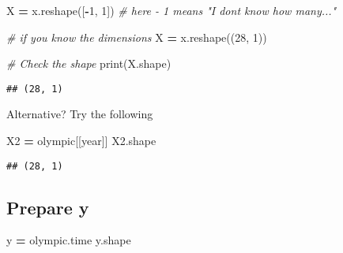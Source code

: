 \documentclass[
]{book}
\newenvironment{Shaded}{\begin{snugshade}}{\end{snugshade}}
\newcommand{\BuiltInTok}[1]{#1}
\newcommand{\CommentTok}[1]{\textcolor[rgb]{0.56,0.35,0.01}{\textit{#1}}}
\newcommand{\DecValTok}[1]{\textcolor[rgb]{0.00,0.00,0.81}{#1}}
\newcommand{\NormalTok}[1]{#1}
\newcommand{\OperatorTok}[1]{\textcolor[rgb]{0.81,0.36,0.00}{\textbf{#1}}}
\newcommand{\StringTok}[1]{\textcolor[rgb]{0.31,0.60,0.02}{#1}}
\begin{document}
\begin{Shaded}
\begin{Highlighting}[]
\NormalTok{X }\OperatorTok{=}\NormalTok{ x.reshape([}\OperatorTok{{-}}\DecValTok{1}\NormalTok{, }\DecValTok{1}\NormalTok{]) }\CommentTok{\# here {-} 1 means "I don\textquotesingle{}t know how many..."}
\end{Highlighting}
\end{Shaded}

\begin{Shaded}
\begin{Highlighting}[]
\CommentTok{\# if you know the dimensions}
\NormalTok{X }\OperatorTok{=}\NormalTok{ x.reshape((}\DecValTok{28}\NormalTok{, }\DecValTok{1}\NormalTok{))}
\end{Highlighting}
\end{Shaded}

\begin{Shaded}
\begin{Highlighting}[]
\CommentTok{\# Check the shape}
\BuiltInTok{print}\NormalTok{(X.shape)}
\end{Highlighting}
\end{Shaded}

\begin{verbatim}
## (28, 1)
\end{verbatim}

Alternative? Try the following

\begin{Shaded}
\begin{Highlighting}[]
\NormalTok{X2 }\OperatorTok{=}\NormalTok{ olympic[[}\StringTok{\textquotesingle{}year\textquotesingle{}}\NormalTok{]]}
\NormalTok{X2.shape}
\end{Highlighting}
\end{Shaded}

\begin{verbatim}
## (28, 1)
\end{verbatim}

\hypertarget{prepare-y}{%
\subsection{Prepare y}\label{prepare-y}}

\begin{Shaded}
\begin{Highlighting}[]
\NormalTok{y }\OperatorTok{=}\NormalTok{ olympic.time}
\NormalTok{y.shape}
\end{Highlighting}
\end{Shaded}
\end{document}
